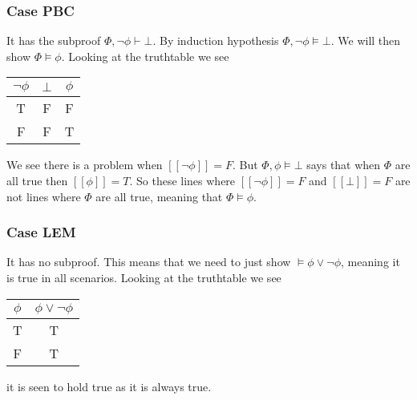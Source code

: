 \documentclass[12pt]{article}
\begin{document}
\subsubsection*{Case PBC}
It has the subproof $\Phi,\neg\phi\vdash\bot$. By induction hypothesis $\Phi,\neg\phi\models\bot$. We will then show $\Phi\models\phi$. Looking at the truthtable we see
\begin{center}
\begin{tabular}{|c|c||c|}
\hline 
$\neg\phi$ & $\bot$ & $\phi$ \\ 
\hline 
T & F & F \\ 
\hline 
F & F & T \\ 
\hline 
\end{tabular} 
\end{center}
We see there is a problem when $[[\neg\phi]]=F$. But $\Phi,\phi\models\bot$ says that when $\Phi$ are all true then $[[\phi]]=T$. So these lines where $[[\neg\phi]]=F$ and $[[\bot]]=F$ are not lines where $\Phi$ are all true, meaning that $\Phi\models\phi$.

\subsubsection*{Case LEM}
It has no subproof. This means that we need to just show $\models\phi\lor\neg\phi$,  meaning it is true in all scenarios. Looking at the truthtable we see
\begin{center}
\begin{tabular}{|c||c|}
\hline 
$\phi$ & $\phi\lor\neg\phi$ \\ 
\hline 
T & T  \\ 
\hline 
F & T \\ 
\hline 
\end{tabular} 
\end{center}
it is seen to hold true as it is always true.
\end{document}
